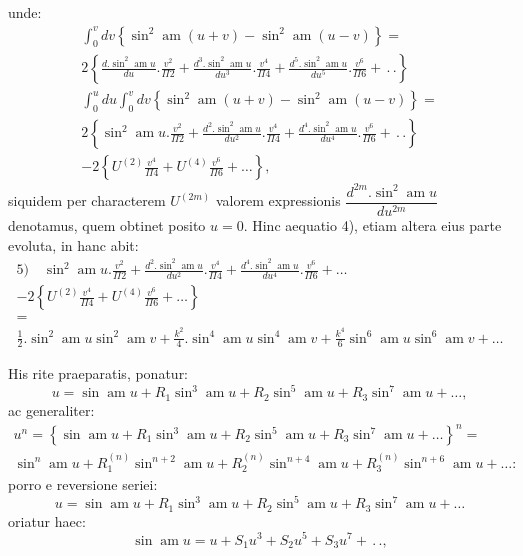 \documentclass{article}
\begin{document}
unde:
\[
\begin{gathered}
\int_{0}^{v}dv\left\{\sin^{2}\operatorname{am}(u+v)-\sin^{2}\operatorname{am}(u-v)\right\}=\\[1.5ex]
2\left\{\frac{d.\sin^{2}\operatorname{am}u}{du}.\frac{v^{2}}{\Pi 2}+\frac{d^{3}.\sin^{2}\operatorname{am}u}{du^{3}}.\frac{v^{4}}{\Pi 4}+\frac{d^{5}.\sin^{2}\operatorname{am}u}{du^{5}}.\frac{v^{6}}{\Pi 6}+\,.\,.\right\}\\[1.5ex]
\int_{0}^{u}du\int_{0}^{v}dv\left\{\sin^{2}\operatorname{am}(u+v)-\sin^{2}\operatorname{am}(u-v)\right\}=\\[1.5ex]
2\left\{\sin^{2}\operatorname{am}u.\frac{v^{2}}{\Pi 2}+\frac{d^{2}.\sin^{2}\operatorname{am}u}{du^{2}}.\frac{v^{4}}{\Pi 4}+\frac{d^{4}.\sin^{2}\operatorname{am}u}{du^{4}}.\frac{v^{6}}{\Pi 6}+\,.\,.\right\}\\[1.5ex]
-2\left\{U^{(2)}\frac{v^{4}}{\Pi 4}+U^{(4)}\frac{v^{6}}{\Pi 6}+\ldots\right\},
\end{gathered}
\]
siquidem per characterem $U^{(2m)}$ valorem expressionis $\dfrac{d^{2m}.\sin^{2}\operatorname{am}u}{du^{2m}}$ denotamus, quem obtinet posito $u=0$. Hinc aequatio 4), etiam altera eius parte evoluta, in hanc abit:
\[
\begin{gathered}
\text{5)}\quad\sin^{2}\operatorname{am}u.\frac{v^{2}}{\Pi 2}+\frac{d^{2}.\sin^{2}\operatorname{am}u}{du^{2}}.\frac{v^{4}}{\Pi 4}+\frac{d^{4}.\sin^{2}\operatorname{am}u}{du^{4}}.\frac{v^{6}}{\Pi 6}+\ldots\\[1.5ex]
-2\left\{U^{(2)}\frac{v^{4}}{\Pi 4}+U^{(4)}\frac{v^{6}}{\Pi 6}+\ldots\right\}\\[1.5ex]
=\\[1.5ex]
\frac{1}{2}.\sin^{2}\operatorname{am}u\sin^{2}\operatorname{am}v+\frac{k^{2}}{4}.\sin^{4}\operatorname{am}u\sin^{4}\operatorname{am}v+\frac{k^{4}}{6}\sin^{6}\operatorname{am}u\sin^{6}\operatorname{am}v+\ldots
\end{gathered}
\]

His rite praeparatis, ponatur:
\[
u=\sin\operatorname{am}u+R_{1}\sin^{3}\operatorname{am}u+R_{2}\sin^{5}\operatorname{am}u+R_{3}\sin^{7}\operatorname{am}u+\ldots,
\]
ac generaliter:
\[
\begin{gathered}
u^{n}=\left\{\sin\operatorname{am}u+R_{1}\sin^{3}\operatorname{am}u+R_{2}\sin^{5}\operatorname{am}u+R_{3}\sin^{7}\operatorname{am}u+\ldots\right\}^{n}=\\[1.5ex]
\sin^{n}\operatorname{am}u+R_{1}^{(n)}\sin^{n+2}\operatorname{am}u+R_{2}^{(n)}\sin^{n+4}\operatorname{am}u+R_{3}^{(n)}\sin^{n+6}\operatorname{am}u+\ldots:
\end{gathered}
\]
porro e reversione seriei:
\[
u=\sin\operatorname{am}u+R_{1}\sin^{3}\operatorname{am}u+R_{2}\sin^{5}\operatorname{am}u+R_{3}\sin^{7}\operatorname{am}u+\ldots
\]
oriatur haec:
\[
\sin\operatorname{am}u=u+S_{1}u^{3}+S_{2}u^{5}+S_{3}u^{7}+\,.\,.,
\]
\end{document}
